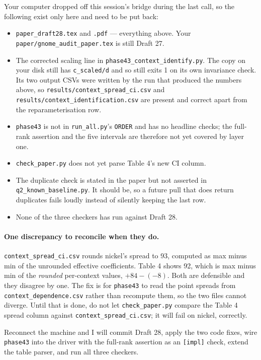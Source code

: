 \documentclass[11pt]{article}
\begin{document}
Your computer dropped off this session's bridge during the last call, so the following
exist only here and need to be put back:

\begin{itemize}
\item \texttt{paper\_draft28.tex} and \texttt{.pdf} --- everything above. Your
\texttt{paper/gnome\_audit\_paper.tex} is still Draft 27.
\item The corrected scaling line in \texttt{phase43\_context\_identify.py}. The copy on
your disk still has \texttt{c\_scaled/d} and so still exits 1 on its own invariance check.
Its two output CSVs were written by the run that produced the numbers above, so
\texttt{results/context\_spread\_ci.csv} and \texttt{results/context\_identification.csv}
are present and correct apart from the reparameterisation row.
\item \texttt{phase43} is not in \texttt{run\_all.py}'s \texttt{ORDER} and has no headline
checks; the full-rank assertion and the five intervals are therefore not yet covered by
layer one.
\item \texttt{check\_paper.py} does not yet parse Table 4's new CI column.
\item The duplicate check is stated in the paper but not asserted in
\texttt{q2\_known\_baseline.py}. It should be, so a future pull that does return duplicates
fails loudly instead of silently keeping the last row.
\item None of the three checkers has run against Draft 28.
\end{itemize}

\paragraph{One discrepancy to reconcile when they do.} \texttt{context\_spread\_ci.csv}
rounds nickel's spread to 93, computed as max minus min of the unrounded effective
coefficients. Table 4 shows 92, which is max minus min of the \emph{rounded} per-context
values, $+84 - (-8)$. Both are defensible and they disagree by one. The fix is for
\texttt{phase43} to read the point spreads from \texttt{context\_dependence.csv} rather
than recompute them, so the two files cannot diverge. Until that is done, do not let
\texttt{check\_paper.py} compare the Table 4 spread column against
\texttt{context\_spread\_ci.csv}; it will fail on nickel, correctly.

Reconnect the machine and I will commit Draft 28, apply the two code fixes, wire
\texttt{phase43} into the driver with the full-rank assertion as an \texttt{[impl]} check,
extend the table parser, and run all three checkers.
\end{document}
